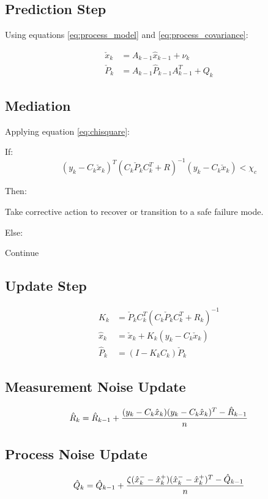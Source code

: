 \documentclass[a4paper]{article}
\begin{document}
	\subsection{Prediction Step}
	Using equations \ref{eq:process_model} and \ref{eq:process_covariance}:

	\begin{align*}
		\check{x}_k &= A_{k-1} \hat{x}_{k-1} + \nu_k\\
		\check{P}_k &= A_{k-1} \hat{P}_{k-1} A_{k-1}^T + Q_k
	\end{align*}

	\subsection{Mediation}
	Applying equation \ref{eq:chisquare}:

	If:
	\begin{equation*}
		(y_k - C_k \check{x}_k)^T (C_k \check{P}_k C_k^T + R)^{-1} (y_k - C_k \check{x}_k) < \chi_c
	\end{equation*}

	Then:
		\begin{center}
			Take corrective action to recover or transition to a safe failure mode.
		\end{center}

	Else:
		\begin{center}
			Continue
		\end{center}

	\subsection{Update Step}
	\begin{align*}
		K_k &=  \check{P}_k C_k^T (C_k \check{P}_k C_k^T + R_k)^{-1} \\
		\hat{x}_k &= \check{x}_k + K_k (y_k - C_k \check{x}_k) \\
		\hat{P}_k &= (I - K_k C_k) \check{P}_k
	\end{align*}

	\subsection{Measurement Noise Update}

	\begin{equation*}
		\hat{R}_k = \hat{R}_{k-1} + {(y_k - C_k \hat{x}_k)(y_k - C_k \hat{x}_k)^T - \hat{R}_{k-1} \over n}
	\end{equation*}

	\subsection{Process Noise Update}

	\begin{equation*}
		\hat{Q}_k = \hat{Q}_{k-1} + {\zeta (\hat{x}_k^- - \hat{x}_k^+)(\hat{x}_k^- - \hat{x}_k^+)^T - \hat{Q}_{k-1} \over n}
	\end{equation*}
\end{document}
